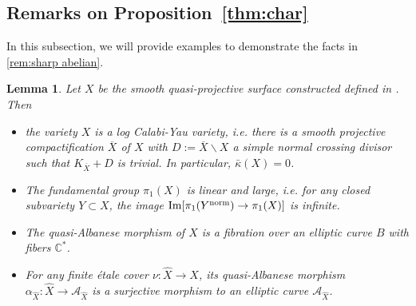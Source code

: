 \documentclass[11pt,english]{smfart}
\theoremstyle{plain}
\newtheorem{lem}[thm]{Lemma}
\theoremstyle{definition}
\theoremstyle{remark}
\numberwithin{equation}{subsection}
\theoremstyle{plain}
\newcommand{\cA}{\mathcal A}
\newcommand{\bC}{\mathbb{C}}
\begin{document}
 \subsection{Remarks on Proposition~\ref{thm:char}} 
In this subsection, we will provide examples to demonstrate the facts in \cref{rem:sharp abelian}.
\begin{lem}
	Let $X$ be the 	smooth quasi-projective surface constructed defined in . Then 
	\begin{itemize}
		\item the variety $X$ is a log Calabi-Yau variety, i.e. there is a smooth projective compactification $\overline{X}$ of  $X$ with $D:=\overline{X}\backslash X$ a simple normal crossing divisor such that $K_{\overline{X}}+D$ is trivial. 
		In particular, $\bar{\kappa}(X)=0$.
		\item The  fundamental group  $\pi_1(X)$ is linear and large, i.e. for any closed  subvariety $Y\subset X$, the image ${\rm Im}[\pi_1(Y^{\rm norm})\to \pi_1(X)]$ is infinite.
		\item The quasi-Albanese morphism of $X$ is a fibration over an elliptic curve $B$ with fibers $\bC^*$.
		\item For any finite \'etale cover $\nu:\widehat{X}\to X$, its quasi-Albanese morphism $\alpha_{\widehat{X}}:\widehat{X}\to \cA_{\widehat{X}}$ is a surjective morphism to an elliptic curve $\cA_{\widehat{X}}$.
\end{itemize}
\end{lem}
\end{document}
